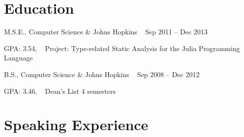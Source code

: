 \documentclass[letterpaper]{article}
\begin{document}
\section*{Education}
\begin{list1}
 \item
  \begin{tabular1bold}
   M.S.E., Computer Science & Johns Hopkins \mbox{ } Sep 2011 -- Dec 2013 \\
  \end{tabular1bold}

 \begin{list2}
  \item GPA: 3.54, \mbox{ } 
   Project: Type-related Static Analysis for the Julia Programming Language
 \end{list2}

 \item
  \begin{tabular1bold}
   B.S., Computer Science & Johns Hopkins \mbox{ } Sep 2008 -- Dec 2012 \\
  \end{tabular1bold}

  \begin{list2}
  \item 
	    GPA: 3.46, \mbox{ }
	    Dean's List 4 semesters
  \end{list2}

\end{list1}

\section*{Speaking Experience}
\end{document}
